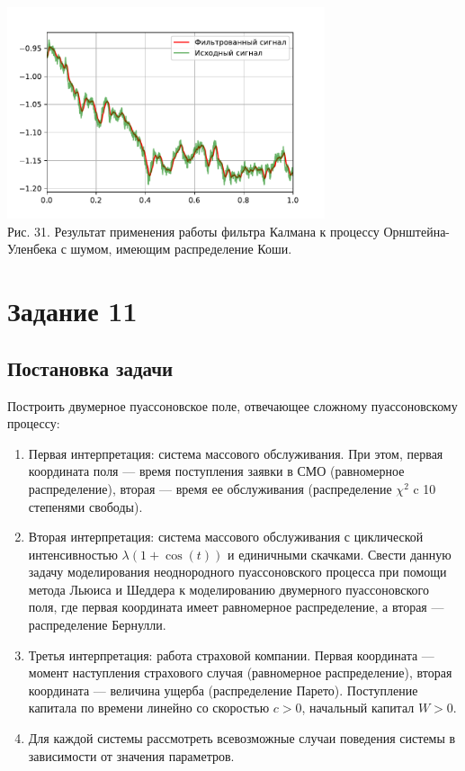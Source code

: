 \documentclass[11pt]{article}
\begin{document}
\begin{center}
	\includegraphics[width=0.7\textwidth]{10_4.pdf}\\
	{Рис. 31. Результат применения работы фильтра Калмана к процессу Орнштейна-Уленбека с шумом, имеющим распределение Коши. }
\end{center}

\newpage

\section{Задание 11}
\subsection{Постановка задачи}
Построить двумерное пуассоновское поле, отвечающее сложному пуассоновскому процессу:
\begin{enumerate}
	\item Первая интерпретация: система массового обслуживания. При этом, первая координата поля --- время поступления заявки в СМО (равномерное распределение), вторая --- время ее обслуживания (распределение $\chi^2$ c 10 степенями свободы).
	\item Вторая интерпретация: система массового обслуживания с циклической интенсивностью $\lambda(1 + \cos(t))$ и единичными скачками. Свести данную задачу моделирования неоднородного пуассоновского процесса при помощи метода Льюиса и Шеддера к моделированию двумерного пуассоновского поля, где первая координата имеет равномерное распределение, а вторая --- распределение Бернулли.
	\item Третья интерпретация: работа страховой компании. Первая координата --- момент наступления страхового случая (равномерное распределение), вторая координата --- величина ущерба (распределение Парето). Поступление капитала по времени линейно со скоростью $c > 0$, начальный капитал $W > 0$.
	\item Для каждой системы  рассмотреть всевозможные случаи поведения системы в зависимости от значения параметров.
\end{enumerate}
\end{document}
